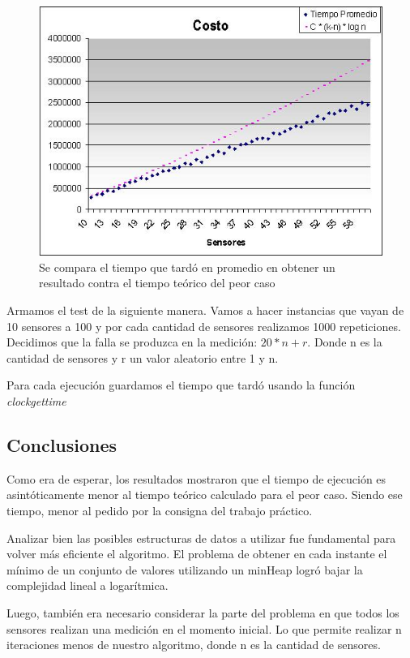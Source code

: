 \begin{figure}[H]
	\centering
	\includegraphics[scale=0.8]{ej2.jpg}
	\caption{ Se compara el tiempo que tard\'o en promedio en obtener un resultado contra el tiempo te\'orico del peor caso}
\end{figure}



\quad Armamos el test de la siguiente manera. Vamos a hacer instancias que vayan de 10 sensores a 100 y por cada cantidad de sensores realizamos 1000 repeticiones. Decidimos que la falla se produzca en la medici\'on: \quad $20 * n + r $. Donde n es la cantidad de sensores y r un valor aleatorio entre 1 y n.

\quad Para cada ejecuci\'on guardamos el tiempo que tard\'o usando la funci\'on \textit{clockgettime}


\subsection{Conclusiones}

\quad Como era de esperar, los resultados mostraron que el tiempo de ejecuci\'on es asint\'oticamente menor al tiempo te\'orico calculado para el peor caso. Siendo ese tiempo, menor al pedido por la consigna del trabajo pr\'actico.

\quad

\quad Analizar bien las posibles estructuras de datos a utilizar fue fundamental para volver m\'as eficiente el algoritmo. El problema de obtener en cada instante el m\'inimo de un conjunto de valores utilizando un minHeap logr\'o bajar la complejidad lineal a logar\'itmica.

\quad

\quad Luego, tambi\'en era necesario considerar la parte del problema en que todos los sensores realizan una medici\'on en el momento inicial. Lo que permite realizar n iteraciones menos de nuestro algoritmo, donde n es la cantidad de sensores.